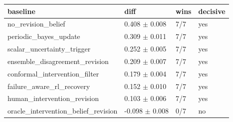 \begin{tabular}{llll}
\toprule
baseline & diff & wins & decisive \\
\midrule
no\_revision\_belief & 0.408 $\pm$ 0.008 & 7/7 & yes \\
periodic\_bayes\_update & 0.309 $\pm$ 0.011 & 7/7 & yes \\
scalar\_uncertainty\_trigger & 0.252 $\pm$ 0.005 & 7/7 & yes \\
ensemble\_disagreement\_revision & 0.209 $\pm$ 0.007 & 7/7 & yes \\
conformal\_intervention\_filter & 0.179 $\pm$ 0.004 & 7/7 & yes \\
failure\_aware\_rl\_recovery & 0.152 $\pm$ 0.010 & 7/7 & yes \\
human\_intervention\_revision & 0.103 $\pm$ 0.006 & 7/7 & yes \\
oracle\_intervention\_belief\_revision & -0.098 $\pm$ 0.008 & 0/7 & no \\
\bottomrule
\end{tabular}
